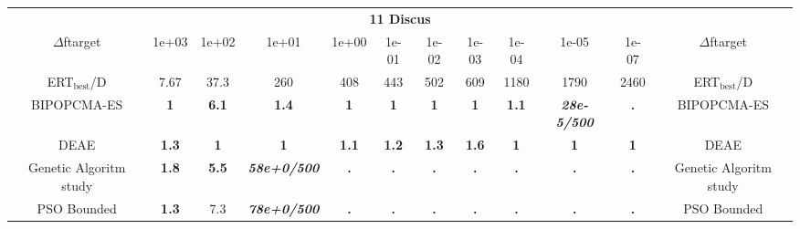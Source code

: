 \begin{tabular}{cccccccccccc}
 & \multicolumn{10}{c}{{\normalsize \textbf{11 Discus}}}\\
$\Delta$ftarget& 1e+03& 1e+02& 1e+01& 1e+00& 1e-01& 1e-02& 1e-03& 1e-04& 1e-05& 1e-07 & $\Delta$ftarget \\
ERT$_{\textrm{best}}$/D& 7.67& 37.3& 260& 408& 443& 502& 609& 1180& 1790& 2460 & ERT$_{\textrm{best}}$/D \\
\hline
BIPOPCMA-ES & \textbf{1} & \textbf{6.1} & \textbf{1.4} & \textbf{1} & \textbf{1} & \textbf{1} & \textbf{1} & \textbf{1.1} & \textbf{\textit{28e-5}\textit{/500}} & \textbf{.} & BIPOPCMA-ES \cite{add_an_entry_for_BIPOPCMA-ES_in_bbob.bib}\\
DEAE & \textbf{1.3} & \textbf{1} & \textbf{1} & \textbf{1.1} & \textbf{1.2} & \textbf{1.3} & \textbf{1.6} & \textbf{1} & \textbf{1} & \textbf{1} & DEAE \cite{add_an_entry_for_DEAE_in_bbob.bib}\\
Genetic Algoritm study & \textbf{1.8} & \textbf{5.5} & \textbf{\textit{58e+0}\textit{/500}} & \textbf{.} & \textbf{.} & \textbf{.} & \textbf{.} & \textbf{.} & \textbf{.} & \textbf{.} & Genetic Algoritm study \cite{add_an_entry_for_Genetic Algoritm study_in_bbob.bib}\\
PSO Bounded & \textbf{1.3} & 7.3 & \textbf{\textit{78e+0}\textit{/500}} & \textbf{.} & \textbf{.} & \textbf{.} & \textbf{.} & \textbf{.} & \textbf{.} & \textbf{.} & PSO Bounded \cite{add_an_entry_for_PSO Bounded_in_bbob.bib}
\end{tabular}
